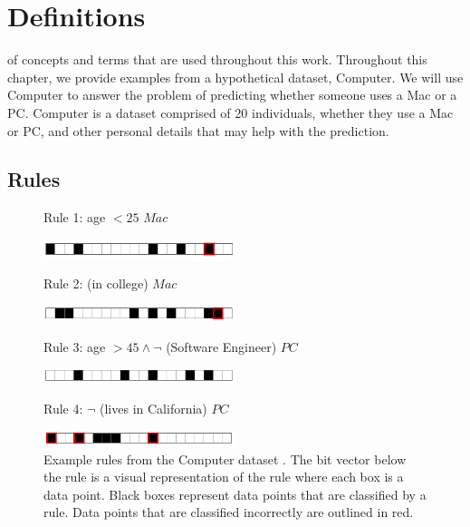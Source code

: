 \chapter{Definitions}\label{ch:definitions}
 of concepts and terms that are used throughout this work. 
Throughout this chapter, we provide examples from a hypothetical dataset, Computer.
We will use Computer to answer the problem of predicting whether someone uses a Mac or a PC.
Computer is a dataset comprised of $20$ individuals, whether they use a Mac or PC, and other personal details that may help with the prediction.

\section{Rules}

\begin{figure}[t!]
\begin{algorithmic}
\normalsize
\State Rule 1: \bif age $< 25$ \bthen $Mac$\,

\begin{raggedleft}
\includegraphics[width=0.5\textwidth]{figs/rule_1_cap.png}
\end{raggedleft}

\State Rule 2: \bif (in college) \bthen $Mac$\,

\begin{raggedleft}
\includegraphics[width=0.5\textwidth]{figs/rule_2_cap.png}
\end{raggedleft}

\State Rule 3: \bif age $> 45 \wedge \neg$ (Software Engineer) \bthen $PC$\,

\begin{raggedleft}
\includegraphics[width=0.5\textwidth]{figs/rule_3_cap.png}
\end{raggedleft}

\State Rule 4: \bif $\neg$ (lives in California) \bthen $PC$\,

\begin{raggedleft}
\includegraphics[width=0.5\textwidth]{figs/rule_4_cap.png}
\end{raggedleft}

\end{algorithmic}
\caption{Example rules from the Computer dataset .
The bit vector below the rule is a visual representation of the rule where each box is a data point.
Black boxes represent data points that are classified by a rule.
Data points that are classified incorrectly are outlined in red.
}
\label{fig:rules}
\end{figure}


